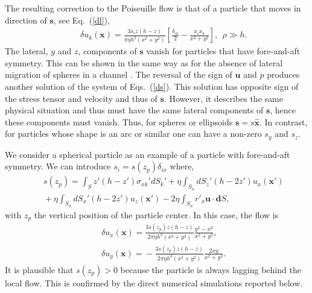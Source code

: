 The resulting correction to the Poiseuille flow is that of
a particle that moves in direction of $\bm s$, see Eq.~(\ref{dl}),
\begin{eqnarray}&&\!\!\!\!\!\!\!\!\!\!\!\!\!\!\!\!
\delta u_k(\bm x)\!=\!\frac{3s_iz(h\!-\!z)}{\pi \eta h^3(x^2+y^2)}\left[\frac{\delta_{ik}}{2}\!-\!\frac{x_ix_k}{x^2+y^2}\right],\ \ \rho\gg h. \label{stks}
\end{eqnarray}
The lateral, $y$ and $z$, components of $\bm s$ vanish for particles that have fore-and-aft symmetry. This can be shown in the same way as for the absence of lateral migration of spheres in a channel \cite{leal,1rd2}.
The reversal of the sign of $\bm u$ and $p$ produces another solution of the system of Eqs.~(\ref{ds}). This solution has opposite sign of the stress tensor and velocity and thus of $\bm s$. However, it describes
the same physical situation and thus must have the same lateral components of $\bm s$, hence these components must vanish. Thus, for spheres or ellipsoids $\bm s=s\bm {\hat x}$. In contrast, for particles whose shape
is an arc or similar one can have a non-zero $s_y$ and $s_z$.

We consider a spherical particle as an example of a particle with fore-and-aft symmetry. We can introduce $s_i=s(z_p)\delta_{ix}$ where,
\begin{eqnarray}&&\!\!\!\!\!\!
s(z_p)=\int_{S}\!\! z'(h\!-\!z') \sigma_{xk}'dS_k'+\eta\int_{S_n}dS_z' (h\!-\!2z')u_x(\bm x')\nonumber\\&&\!\!\!\!\!\!+\eta\int_{S_n}dS_x' (h\!-\!2z')u_{z}(\bm x')
-2\eta\int_{S_n}r'_x \bm u\cdot{\bm dS}, \ \
\end{eqnarray}
with $z_p$ the vertical position of the particle center. In this case, the flow is
\begin{eqnarray}&&\!\!\!\!\!\!\!\!\!\!\!\!\!\!\!\!
\delta u_x(\bm x)\!=\!\frac{3s(z_p)z(h\!-\!z)}{2\pi \eta h^3(x^2+y^2)}\frac{y^2- x^2}{x^2+y^2},\nonumber\\&&\!\!\!\!\!\!\!\!\!\!\!\!\!\!\!\!\!
\delta u_y(\bm x)\!=\!-\frac{3s(z_p)z(h\!-\!z)}{2\pi \eta h^3(x^2+y^2)}\frac{2xy}{x^2+y^2}.
\label{dist_flow}
\end{eqnarray}
It is plausible that $s(z_p)>0$ because the particle is always lagging behind the local flow. This is confirmed by the direct numerical simulations reported below.

